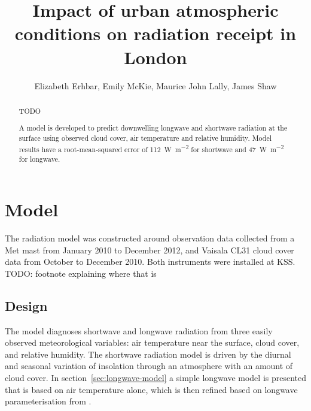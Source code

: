 \documentclass[a4paper,titlepage, twoside]{report}
\begin{document}
\title{Impact of urban atmospheric conditions on radiation receipt in London}
\author{Elizabeth Erhbar, Emily McKie, Maurice John Lally, James Shaw}
\maketitle

\begin{abstract}
TODO

A model is developed to predict downwelling longwave and shortwave radiation at the surface using observed cloud cover, air temperature and relative humidity.  Model results have a root-mean-squared error of \SI{112}{\watt\per\meter\squared} for shortwave and \SI{47}{\watt\per\meter\squared} for longwave.
\end{abstract}

\tableofcontents

\chapter{Model}
The radiation model was constructed around observation data collected from a Met mast from January 2010 to December 2012, and Vaisala CL31 cloud cover data from October to December 2010.  Both instruments were installed at KSS. TODO: footnote explaining where that is

\section{Design}
The model diagnoses shortwave and longwave radiation from three easily observed meteorological variables: air temperature near the surface, cloud cover, and relative humidity.  The shortwave radiation model is driven by the diurnal and seasonal variation of insolation through an atmosphere with an amount of cloud cover.  In section~\ref{sec:longwave-model} a simple longwave model is presented that is based on air temperature alone, which is then refined based on longwave parameterisation from \cite{loridan}.
\end{document}
